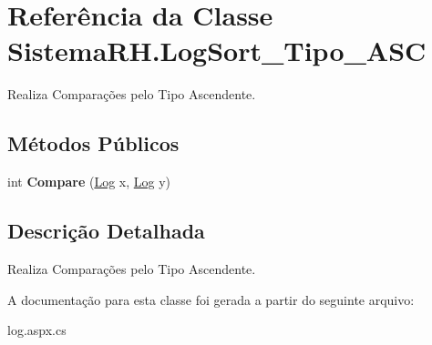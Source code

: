 \hypertarget{class_sistema_r_h_1_1_log_sort___tipo___a_s_c}{
\section{Referência da Classe SistemaRH.LogSort\_\-Tipo\_\-ASC}
\label{class_sistema_r_h_1_1_log_sort___tipo___a_s_c}
}


Realiza Comparações pelo Tipo Ascendente.  


\subsection*{Métodos Públicos}
\begin{DoxyCompactItemize}
\item 
\hypertarget{class_sistema_r_h_1_1_log_sort___tipo___a_s_c_a865935661ad32fab344502df97714f2f}{
int {\bfseries Compare} (\hyperlink{class_sistema_r_h_1_1_log}{Log} x, \hyperlink{class_sistema_r_h_1_1_log}{Log} y)}
\label{class_sistema_r_h_1_1_log_sort___tipo___a_s_c_a865935661ad32fab344502df97714f2f}

\end{DoxyCompactItemize}


\subsection{Descrição Detalhada}
Realiza Comparações pelo Tipo Ascendente. 

A documentação para esta classe foi gerada a partir do seguinte arquivo:\begin{DoxyCompactItemize}
\item 
log.aspx.cs\end{DoxyCompactItemize}
